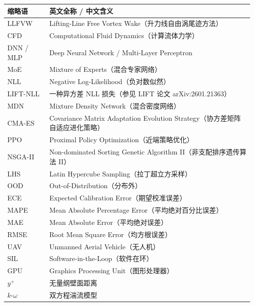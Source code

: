 \begin{tabular}{p{3cm}p{10cm}}
\toprule
\textbf{缩略语} & \textbf{英文全称 / 中文含义}                                        \\
\midrule
LLFVW          & Lifting-Line Free Vortex Wake（升力线自由涡尾迹方法）                   \\
CFD            & Computational Fluid Dynamics（计算流体力学）                       \\
DNN / MLP      & Deep Neural Network / Multi-Layer Perceptron                      \\
MoE            & Mixture of Experts（混合专家网络）                                  \\
NLL            & Negative Log-Likelihood（负对数似然）                              \\
LIFT-NLL       & 一种异方差 NLL 损失（参见 LIFT 论文 arXiv:2601.21363）                 \\
MDN            & Mixture Density Network（混合密度网络）                            \\
CMA-ES         & Covariance Matrix Adaptation Evolution Strategy（协方差矩阵自适应进化策略） \\
PPO            & Proximal Policy Optimization（近端策略优化）                        \\
NSGA-II        & Non-dominated Sorting Genetic Algorithm II（非支配排序遗传算法 II）    \\
LHS            & Latin Hypercube Sampling（拉丁超立方采样）                          \\
OOD            & Out-of-Distribution（分布外）                                     \\
ECE            & Expected Calibration Error（期望校准误差）                          \\
MAPE           & Mean Absolute Percentage Error（平均绝对百分比误差）                  \\
MAE            & Mean Absolute Error（平均绝对误差）                                 \\
RMSE           & Root Mean Square Error（均方根误差）                                \\
UAV            & Unmanned Aerial Vehicle（无人机）                                  \\
SIL            & Software-in-the-Loop（软件在环）                                   \\
GPU            & Graphics Processing Unit（图形处理器）                              \\
$y^+$          & 无量纲壁面距离                                                      \\
$k$-$\omega$   & 双方程湍流模型                                                      \\
\bottomrule
\end{tabular}

